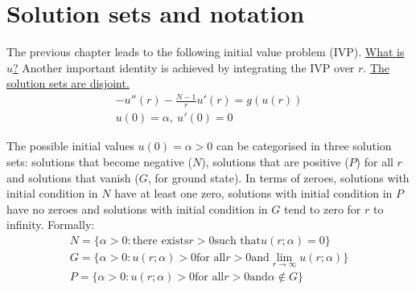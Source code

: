 \section{Solution sets and notation}\label{not}
The previous chapter leads to the following initial value problem (IVP). \underline{What is $u$?} Another important identity is achieved by integrating the IVP over $r$. \underline{The solution sets are disjoint.}
\begin{gather*}-u''(r)-\frac{N-1}{r}u'(r)=g(u(r))\tag{IVP}\label{ivp}\\ u(0)=\alpha,~u'(0)=0\end{gather*}
\begin{equation}\label{ivpint}
\end{equation}

The possible initial values $u(0)=\alpha>0$ can be categorised in three solution sets: solutions that become negative ($N$), solutions that are positive ($P$) for all $r$ and solutions that vanish ($G$, for ground state). In terms of zeroes, solutions with initial condition in $N$ have at least one zero, solutions with initial condition in $P$ have no zeroes and solutions with initial condition in $G$ tend to zero for $r$ to infinity. Formally:
\begin{gather*}
  N = \{\alpha>0: \text{there exists} r>0 \text{such that} u(r;\alpha)=0\} \\
  G = \{\alpha>0: u(r;\alpha)>0 \text{for all} r>0 \text{and} \underset{r\to\infty}{\lim}u(r;\alpha)\}\\
  P = \{\alpha>0: u(r;\alpha)>0 \text{for all} r>0 \text{and} \alpha\notin G\}
\end{gather*}
